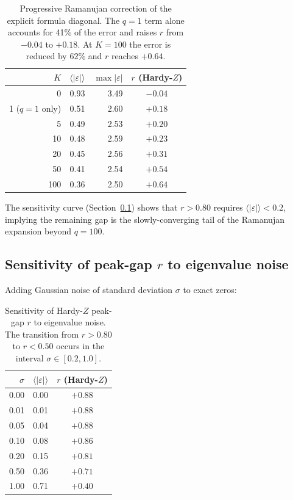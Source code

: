 \documentclass[11pt,a4paper]{article}
\begin{document}
\begin{table}[ht]
\centering
\begin{tabular}{@{}rrrc@{}}
\toprule
$K$ & $\langle|\varepsilon|\rangle$ & $\max|\varepsilon|$ & $r$ (Hardy-$Z$) \\
\midrule
0  & 0.93 & 3.49 & $-0.04$ \\
1 ($q\!=\!1$ only) & 0.51 & 2.60 & $+0.18$ \\
5  & 0.49 & 2.53 & $+0.20$ \\
10 & 0.48 & 2.59 & $+0.23$ \\
20 & 0.45 & 2.56 & $+0.31$ \\
50 & 0.41 & 2.54 & $+0.54$ \\
100 & 0.36 & 2.50 & $+0.64$ \\
\bottomrule
\end{tabular}
\caption{Progressive Ramanujan correction of the explicit formula diagonal. The $q = 1$ term alone accounts for 41\% of the error and raises $r$ from $-0.04$ to $+0.18$. At $K = 100$ the error is reduced by 62\% and $r$ reaches $+0.64$.}
\label{tab:ramcorrect}
\end{table}

The sensitivity curve (Section~\ref{sec:sensitivity}) shows that $r > 0.80$ requires $\langle|\varepsilon|\rangle < 0.2$, implying the remaining gap is the slowly-converging tail of the Ramanujan expansion beyond $q = 100$.

\subsection{Sensitivity of peak-gap $r$ to eigenvalue noise}\label{sec:sensitivity}

Adding Gaussian noise of standard deviation $\sigma$ to exact zeros:

\begin{table}[ht]
\centering
\begin{tabular}{@{}rrc@{}}
\toprule
$\sigma$ & $\langle|\varepsilon|\rangle$ & $r$ (Hardy-$Z$) \\
\midrule
0.00 & 0.00 & $+0.88$ \\
0.01 & 0.01 & $+0.88$ \\
0.05 & 0.04 & $+0.88$ \\
0.10 & 0.08 & $+0.86$ \\
0.20 & 0.15 & $+0.81$ \\
0.50 & 0.36 & $+0.71$ \\
1.00 & 0.71 & $+0.40$ \\
\bottomrule
\end{tabular}
\caption{Sensitivity of Hardy-$Z$ peak-gap $r$ to eigenvalue noise. The transition from $r > 0.80$ to $r < 0.50$ occurs in the interval $\sigma \in [0.2, 1.0]$.}
\label{tab:sensitivity}
\end{table}
\end{document}
